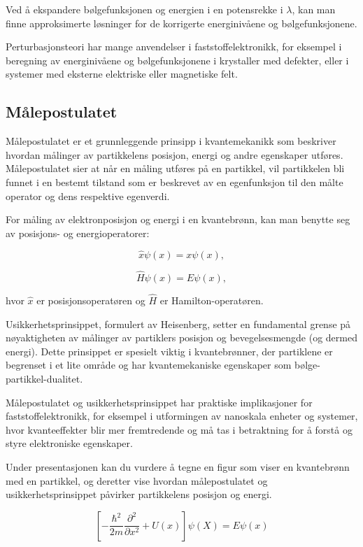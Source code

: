 Ved å ekspandere bølgefunksjonen og energien i en potensrekke i $\lambda$, kan man finne approksimerte løsninger for de korrigerte energinivåene og bølgefunksjonene.

Perturbasjonsteori har mange anvendelser i faststoffelektronikk, for eksempel i beregning av energinivåene og bølgefunksjonene i krystaller med defekter, eller i systemer med eksterne elektriske eller magnetiske felt.

\subsection*{Målepostulatet}
Målepostulatet er et grunnleggende prinsipp i kvantemekanikk som beskriver hvordan målinger av partikkelens posisjon, energi og andre egenskaper utføres. Målepostulatet sier at når en måling utføres på en partikkel, vil partikkelen bli funnet i en bestemt tilstand som er beskrevet av en egenfunksjon til den målte operator og dens respektive egenverdi.

For måling av elektronposisjon og energi i en kvantebrønn, kan man benytte seg av posisjons- og energioperatorer:

\begin{equation*}
\hat{x}\psi(x) = x\psi(x),
\end{equation*}

\begin{equation*}
\hat{H}\psi(x) = E\psi(x),
\end{equation*}

hvor $\hat{x}$ er posisjonsoperatøren og $\hat{H}$ er Hamilton-operatøren.

Usikkerhetsprinsippet, formulert av Heisenberg, setter en fundamental grense på nøyaktigheten av målinger av partiklers posisjon og bevegelsesmengde (og dermed energi). Dette prinsippet er spesielt viktig i kvantebrønner, der partiklene er begrenset i et lite område og har kvantemekaniske egenskaper som bølge-partikkel-dualitet.

Målepostulatet og usikkerhetsprinsippet har praktiske implikasjoner for faststoffelektronikk, for eksempel i utformingen av nanoskala enheter og systemer, hvor kvanteeffekter blir mer fremtredende og må tas i betraktning for å forstå og styre elektroniske egenskaper.

Under presentasjonen kan du vurdere å tegne en figur som viser en kvantebrønn med en partikkel, og deretter vise hvordan målepostulatet og usikkerhetsprinsippet påvirker partikkelens posisjon og energi.

\begin{equation*}
    \left[-\frac{\hbar^2}{2m} \frac{\partial^2}{\partial x^2}+U(x)\right]\psi(X)=E\psi(x)
\end{equation*}

